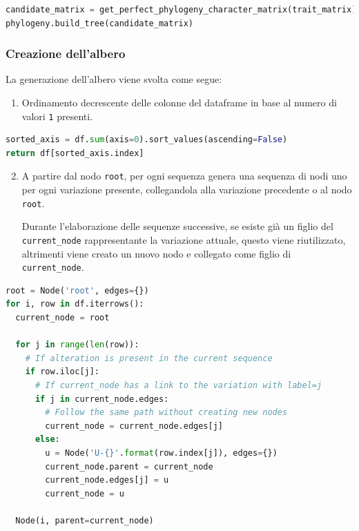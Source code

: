 \documentclass[11pt,italian]{article}
\begin{document}
\begin{lstlisting}[caption=Chiamata alla generazione dell'albero,label=code:tree_creation,language=Python]
candidate_matrix = get_perfect_phylogeny_character_matrix(trait_matrix)
phylogeny.build_tree(candidate_matrix)
\end{lstlisting}

\subsubsection{Creazione dell'albero}
\noindent
La generazione dell'albero viene svolta come segue:
\begin{enumerate}
  \item Ordinamento decrescente delle colonne del dataframe in base al numero di valori \lstinline{1} presenti.
\end{enumerate}
\begin{lstlisting}[caption=Ordinamento decrescente delle colonne,label=code:desc_column_sorting,language=Python]
sorted_axis = df.sum(axis=0).sort_values(ascending=False)
return df[sorted_axis.index]
\end{lstlisting}

\begin{enumerate}
  \setcounter{enumi}{1}
  \item A partire dal nodo \lstinline{root}, per ogni sequenza genera una sequenza di nodi uno per ogni variazione presente, collegandola alla variazione precedente o al nodo \lstinline{root}.

  Durante l'elaborazione delle sequenze successive, se esiste già un figlio del \lstinline{current_node} rappresentante la variazione attuale, questo viene riutilizzato, altrimenti viene creato un nuovo nodo e collegato come figlio di \lstinline{current_node}.
\end{enumerate}
\begin{lstlisting}[caption=Funzione di creazione dell'albero,label=code:tree_creation_function,language=Python]
root = Node('root', edges={})
for i, row in df.iterrows():
  current_node = root

  for j in range(len(row)):
    # If alteration is present in the current sequence
    if row.iloc[j]:
      # If current_node has a link to the variation with label=j
      if j in current_node.edges:
        # Follow the same path without creating new nodes
        current_node = current_node.edges[j]
      else:
        u = Node('U-{}'.format(row.index[j]), edges={})
        current_node.parent = current_node
        current_node.edges[j] = u
        current_node = u

  Node(i, parent=current_node)
\end{lstlisting}
\end{document}
